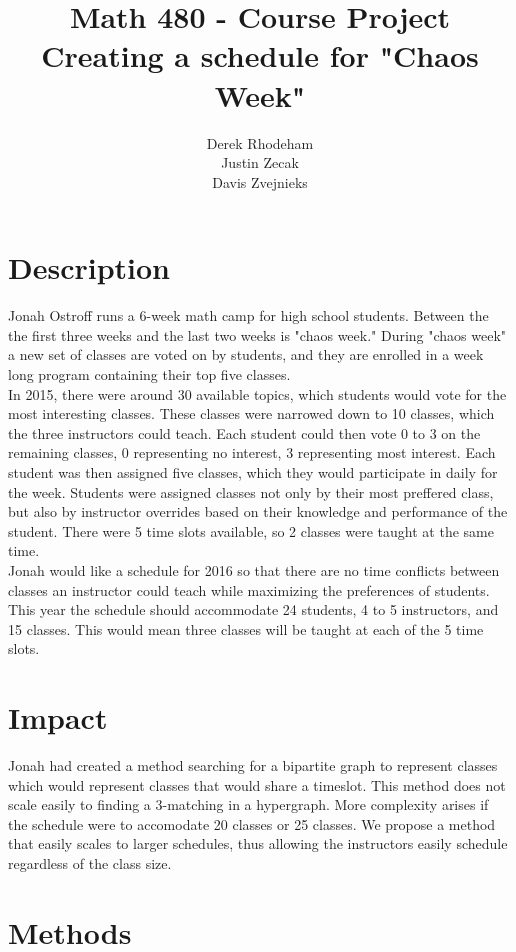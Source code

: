 \documentclass[11pt]{article}
\title{\textbf{Math 480 - Course Project}
			  \\Creating a schedule for "Chaos Week"}
\author{Derek Rhodeham\\
		Justin Zecak\\
		Davis Zvejnieks}
\date{}
\begin{document}
\maketitle

\section{Description}
Jonah Ostroff runs a 6-week math camp for high school students. Between the the first three weeks and the last two weeks is "chaos week." During "chaos week" a new set of classes are voted on by students, and they are enrolled in a week long program containing their top five classes.\\
\indent In 2015, there were around 30 available topics, which students would vote for the most interesting classes. These classes were narrowed down to 10 classes, which the three instructors could teach. Each student could then vote 0 to 3 on the remaining classes, 0 representing no interest, 3 representing most interest. Each student was then assigned five classes, which they would participate in daily for the week. Students were assigned classes not only by their most preffered class, but also by instructor overrides based on their knowledge and performance of the student. There were 5 time slots available, so 2 classes were taught at the same time.\\
\indent Jonah would like a schedule for 2016 so that there are no time conflicts between classes an instructor could teach while maximizing the preferences of students. This year the schedule should accommodate 24 students, 4 to 5 instructors, and 15 classes. This would mean three classes will be taught at each of the 5 time slots.


\section{Impact}
Jonah had created a method searching for a bipartite graph to represent classes which would represent classes that would share a timeslot. This method does not scale easily to finding a 3-matching in a hypergraph. More complexity arises if the schedule were to accomodate 20 classes or 25 classes.
\indent We propose a method that easily scales to larger schedules, thus allowing the instructors easily schedule regardless of the class size.


\section{Methods}
\end{document}
